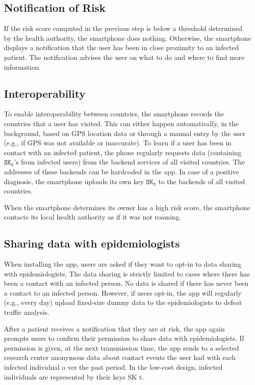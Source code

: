 \documentclass[10.8pt,a4paper]{article}
\begin{document}
\subsection{Notification of Risk}
If the risk score computed in the previous step is below a threshold determined by the health authority, the smartphone does nothing. Otherwise, the smartphone displays a notification that the user has been in close proximity to an infected patient. The notification advises the user on what to do and where to find more information.
\subsection{Interoperability}
To enable interoperability between countries, the smartphone records the countries that a
user has visited. This can either happen automatically, in the background, based on GPS
location data or through a manual entry by the user (e.g., if GPS was not available or
inaccurate). To learn if a user has been in contact with an infected patient, the phone
regularly requests data (containing $\texttt{SK}_\texttt{t}$’s from infected users) from the backend services of all visited countries. The addresses of these backends can be hardcoded in the app. In case of a positive diagnosis, the smartphone uploads its own key $\texttt{SK}_\texttt{t}$ to the backends of all visited countries.

When the smartphone determines its owner has a high risk score, the smartphone contacts
its local health authority as if it was not roaming.

\subsection{Sharing data with epidemiologists}

When installing the app, users are asked if they want to opt-in to data sharing with epidemiologists. The data sharing is strictly limited to cases where there has been a contact with an infected person. No data is shared if there has never been a contact to an infected person. However, if users opt-in, the app will regularly (e.g., every day) upload fixed-size dummy data to the epidemiologists to defeat traffic analysis.

After a patient receives a notification that they are at risk, the app again prompts users to confirm their permission to share data with epidemiologists. If permission is given, at the next transmission time, the app sends to a selected research center  anonymous data about contact events the user had  with each infected individual o  ver the past period. In the low-cost design, infected individuals are represented by their keys  SK t. 
\end{document}
